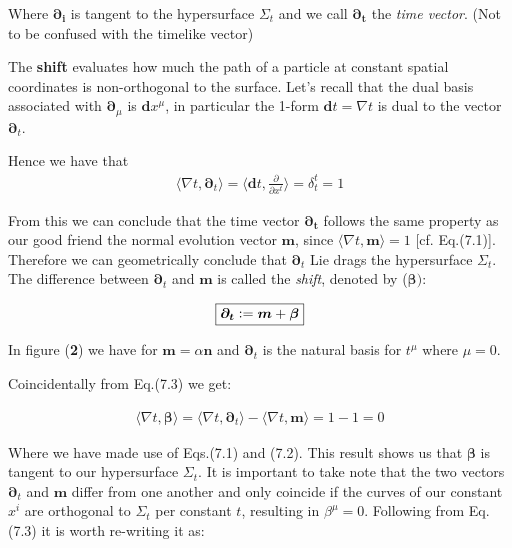 \documentclass[12pt]{article}
\renewcommand{\vec}[1]{\bm{#1}}
\numberwithin{equation}{section}
\numberwithin{theorem}{subsection}
\newcommand{\defeq}{\vcentcolon=}
\begin{document}
Where $\vec{\partial_{i}}$ is tangent to the hypersurface $\Sigma_{t}$ and we call $\vec{\partial_{t}}$ the \textit{time vector}. (Not to be confused with the timelike vector) \newline

The \textbf{shift} evaluates how much the path of a particle at constant spatial coordinates is non-orthogonal to the surface. \newline Let's recall that the dual basis associated with $\vec{\partial}_{\mu}$ is $\vec{d}x^{\mu}$, in particular the 1-form $\vec{d}t=\nabla t$ is dual to the vector $\vec{\partial}_{t}$.

Hence we have that \begin{align}

    \langle \nabla t, \vec{\partial}_{t} \rangle = \langle \vec{d}t, \frac{\partial}{\partial x^{t}} \rangle = \delta^{t}_{t} = 1

\end{align}

From this we can conclude that the time vector $\vec{\partial_{t}}$ follows the same property as our good friend the normal evolution vector $\vec{m}$, since $\langle \nabla t, \vec{m} \rangle = 1$ [cf. Eq.(7.1)]. Therefore we can geometrically conclude that $\vec{\partial}_{t}$ Lie drags the hypersurface $\Sigma_{t}$. The difference between $\vec{\partial}_{t}$ and $\vec{m}$ is called the \textit{shift}, denoted by ($\vec{\beta})$:

\begin{align}

   \boxed{\vec{\partial_{t}} \defeq \vec{m} + \vec{\beta}}

\end{align}

In figure (\textbf{2}) we have for $\vec{m}=\alpha \vec{n}$ and $\vec{\partial}_{t}$ is the natural basis for $t^{\mu}$ where $\mu = 0$.

Coincidentally from Eq.(7.3) we get:

\begin{align*}

    \langle \nabla t, \vec{\beta} \rangle = \langle \nabla t, \vec{\partial}_{t} \rangle - \langle \nabla t, \vec{m} \rangle = 1 - 1 = 0

\end{align*}

Where we have made use of Eqs.(7.1) and (7.2). This result shows us that $\vec{\beta}$ is tangent to our hypersurface $\Sigma_{t}$. It is important to take note that the two vectors $\vec{\partial}_{t}$ and $\vec{m}$ differ from one another and only coincide if the curves of our constant $x^{i}$ are orthogonal to $\Sigma_{t}$ per constant $t$, resulting in $\beta^{\mu}=0$. Following from Eq.(7.3) it is worth re-writing it as: 
\end{document}
